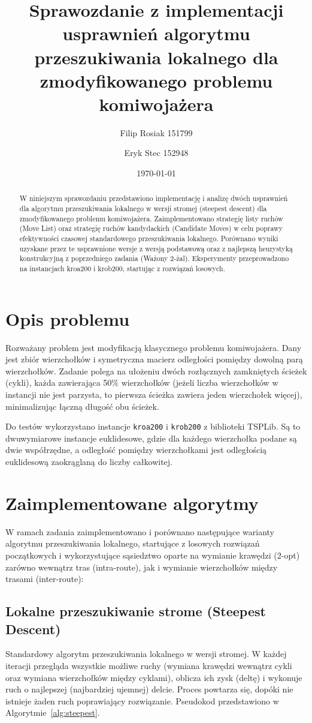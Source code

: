 \documentclass[12pt,a4paper]{article}
\title{Sprawozdanie z implementacji usprawnień algorytmu przeszukiwania lokalnego dla zmodyfikowanego problemu komiwojażera}
\author{Filip Rosiak 151799  \and Eryk Stec 152948}
\date{\today}
\begin{document}
\maketitle

\begin{abstract}
W niniejszym sprawozdaniu przedstawiono implementację i analizę dwóch usprawnień dla algorytmu przeszukiwania lokalnego w wersji stromej (steepest descent) dla zmodyfikowanego problemu komiwojażera. Zaimplementowano strategię listy ruchów (Move List) oraz strategię ruchów kandydackich (Candidate Moves) w celu poprawy efektywności czasowej standardowego przeszukiwania lokalnego. Porównano wyniki uzyskane przez te usprawnione wersje z wersją podstawową oraz z najlepszą heurystyką konstrukcyjną z poprzedniego zadania (Ważony 2-żal). Eksperymenty przeprowadzono na instancjach kroa200 i krob200, startując z rozwiązań losowych.
\end{abstract}

\section{Opis problemu}
Rozważany problem jest modyfikacją klasycznego problemu komiwojażera. Dany jest zbiór wierzchołków i symetryczna macierz odległości pomiędzy dowolną parą wierzchołków. Zadanie polega na ułożeniu dwóch rozłącznych zamkniętych ścieżek (cykli), każda zawierająca 50\% wierzchołków (jeżeli liczba wierzchołków w instancji nie jest parzysta, to pierwsza ścieżka zawiera jeden wierzchołek więcej), minimalizując łączną długość obu ścieżek.

Do testów wykorzystano instancje \texttt{kroa200} i \texttt{krob200} z biblioteki TSPLib. Są to dwuwymiarowe instancje euklidesowe, gdzie dla każdego wierzchołka podane są dwie współrzędne, a odległość pomiędzy wierzchołkami jest odległością euklidesową zaokrąglaną do liczby całkowitej.

\section{Zaimplementowane algorytmy}
W ramach zadania zaimplementowano i porównano następujące warianty algorytmu przeszukiwania lokalnego, startujące z losowych rozwiązań początkowych i wykorzystujące sąsiedztwo oparte na wymianie krawędzi (2-opt) zarówno wewnątrz tras (intra-route), jak i wymianie wierzchołków między trasami (inter-route):

\subsection{Lokalne przeszukiwanie strome (Steepest Descent)}
Standardowy algorytm przeszukiwania lokalnego w wersji stromej. W każdej iteracji przegląda wszystkie możliwe ruchy (wymiana krawędzi wewnątrz cykli oraz wymiana wierzchołków między cyklami), oblicza ich zysk (deltę) i wykonuje ruch o najlepszej (najbardziej ujemnej) delcie. Proces powtarza się, dopóki nie istnieje żaden ruch poprawiający rozwiązanie. Pseudokod przedstawiono w Algorytmie~\ref{alg:steepest}.
\end{document}
